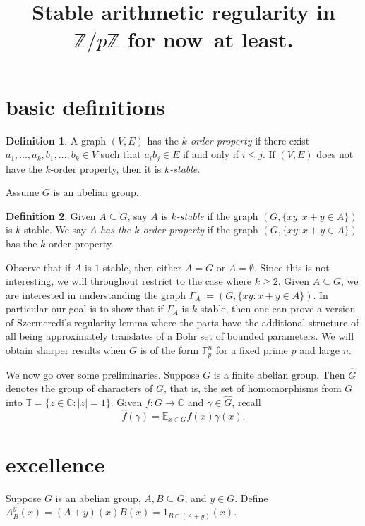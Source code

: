 \documentclass[11pt]{article}
\title{
Stable arithmetic regularity in $\mathbb{Z}/p\mathbb{Z}$ for now--at least.
}
\author{
}
\date{}
\theoremstyle{definition}
\newtheorem{definition}{Definition}
\begin{document}
\maketitle


\section{basic definitions}


\begin{definition}
A graph $(V,E)$ has the \emph{$k$-order property} if there exist $a_1,\ldots, a_k,b_1,\ldots, b_k\in V$ such that $a_ib_j\in E$ if and only if $i\leq j$. If $(V,E)$ does not have the $k$-order property, then it is \emph{$k$-stable}.
\end{definition}

Assume $G$ is an abelian group.  
\begin{definition}
Given $A\subseteq G$, say $A$ is \emph{$k$-stable} if the graph $(G,\{xy: x+y\in A\})$ is $k$-stable.  We say $A$ \emph{has the $k$-order property} if the graph $(G,\{xy: x+y\in A\})$ has the $k$-order property.
\end{definition}

Observe that if $A$ is $1$-stable, then either $A=G$ or $A=\emptyset$.  Since this is not interesting, we will throughout restrict to the case where $k\geq 2$. Given $A\subseteq G$, we are interested in understanding the graph $\Gamma_A:=(G,\{xy: x+y\in A\})$.  In particular our goal is to show that if $\Gamma_A$ is $k$-stable, then one can prove a version of Szermeredi's regularity lemma where the parts have the additional structure of all being approximately translates of a Bohr set of bounded parameters.  We will obtain sharper results when $G$ is of the form $\mathbb{F}_p^n$ for a fixed prime $p$ and large $n$.  

We now go over some preliminaries. Suppose $G$ is a finite abelian group.  Then $\widehat{G}$ denotes the group of characters of $G$, that is, the set of homomorphisms from $G$ into $\mathbb{T}=\{z\in \mathbb{C}: |z|=1\}$.  Given $f:G\rightarrow \mathbb{C}$ and $\gamma\in \widehat{G}$, recall 
$$
\widehat{f}(\gamma)=\mathbb{E}_{x\in G} f(x)\gamma(x).
$$



\section{excellence}
Suppose $G$ is an abelian group, $A, B\subseteq G$, and $y\in G$.  Define $A^{y}_B(x)=(A+y)(x)B(x)=1_{B\cap (A+y)}(x)$. 
\end{document}
